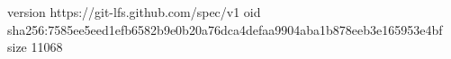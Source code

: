version https://git-lfs.github.com/spec/v1
oid sha256:7585ee5eed1efb6582b9e0b20a76dca4defaa9904aba1b878eeb3e165953e4bf
size 11068
